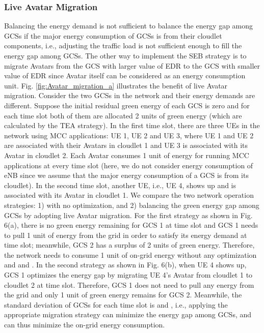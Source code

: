 \documentclass[journal,12pt,draftclsnofoot,onecolumn]{IEEEtran}
\begin{document}
\subsubsection{Live Avatar Migration}
Balancing the energy demand is not sufficient to balance the energy gap among GCSs if the major energy consumption of GCSs is from their cloudlet components, i.e., adjusting the traffic load is not sufficient enough to fill the energy gap among GCSs. The other way to implement the SEB strategy is to migrate Avatars from the GCS with larger value of EDR to the GCS with smaller value of EDR since Avatar itself can be considered as an energy consumption unit. Fig. \ref{fig:Avatar_migration_a} illustrates the benefit of live Avatar migration. Consider the two GCSs in the network and their energy demands are different. Suppose the initial residual green energy of each GCS is zero and for each time slot both of them are allocated 2 units of green energy (which are calculated by the TEA strategy). In the first time slot, there are three UEs in the network using MCC applications: UE 1, UE 2 and UE 3, where UE 1 and UE 2 are associated with their Avatars in cloudlet 1 and UE 3 is associated with its Avatar in cloudlet 2. Each Avatar consumes 1 unit of energy for running MCC applications at every time slot (here, we do not consider energy consumption of eNB since we assume that the major energy consumption of a GCS is from its cloudlet). In the second time slot, another UE, i.e., UE 4, shows up and is associated with its Avatar in cloudlet 1. We compare the two network operation strategies: 1) with no optimization, and 2) balancing the green energy gap among GCSs by adopting live Avatar migration. For the first strategy as shown in Fig. 6(a), there is no green energy remaining for GCS 1 at  time slot and GCS 1 needs to pull 1 unit of energy from the grid in order to satisfy its energy demand at  time slot; meanwhile, GCS 2 has a surplus of 2 units of green energy. Therefore, the network needs to consume 1 unit of on-grid energy without any optimization and  and . In the second strategy as shown in Fig. 6(b), when UE 4 shows up, GCS 1 optimizes the energy gap by migrating UE 4's Avatar from cloudlet 1 to cloudlet 2 at  time slot. Therefore, GCS 1 does not need to pull any energy from the grid and only 1 unit of green energy remains for GCS 2. Meanwhile, the standard deviation of GCSs for each time slot is  and , i.e., applying the appropriate migration strategy can minimize the energy gap among GCSs, and can thus minimize the on-grid energy consumption.
\end{document}
